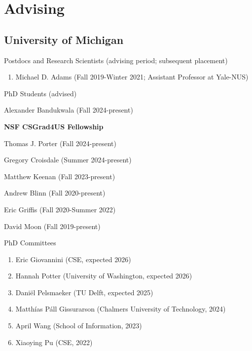 \documentclass[10pt,letterpaper]{article}
\renewenvironment{itemize}{
  \begin{list}{}{
    \setlength{\leftmargin}{1.25em}
    \setlength{\itemsep}{0.25em}
    \setlength{\parskip}{0pt}
    \setlength{\parsep}{0.2em}
  }
}{
  \end{list}
}
\begin{document}
\section*{Advising}

\subsection*{University of Michigan}
\begin{itemize}
  \item Postdocs and Research Scientists (advising period; subsequent placement)
        \begin{enumerate}
          \item Michael D. Adams (Fall 2019-Winter 2021; Assistant Professor at Yale-NUS)
        \end{enumerate}
  \item PhD Students (advised)
        \begin{enumerate}
          \item Alexander Bandukwala (Fall 2024-present)
            \begin{itemize}
              \item \textbf{NSF CSGrad4US Fellowship}
            \end{itemize}
          \item Thomas J. Porter (Fall 2024-present)
          \item Gregory Croisdale (Summer 2024-present)
          \item Matthew Keenan (Fall 2023-present)
          \item Andrew Blinn (Fall 2020-present)
          \item Eric Griffis (Fall 2020-Summer 2022)
          \item David Moon (Fall 2019-present)
        \end{enumerate}
  \item PhD Committees
        \begin{enumerate}
          \item Eric Giovannini (CSE, expected 2026)
          \item Hannah Potter (University of Washington, expected 2026)
          \item Daniël Pelsmaeker (TU Delft, expected 2025)
          \item Matthías Páll Gissurarson (Chalmers University of Technology, 2024)
          \item April Wang (School of Information, 2023)
          \item Xiaoying Pu (CSE, 2022)

\end{enumerate}
\end{itemize}
\end{document}
